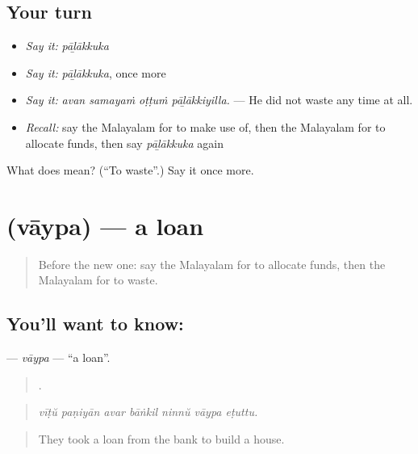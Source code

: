 \subsection*{Your turn}
\begin{itemize}
\raggedright
  \item \emph{Say it:} \emph{pāḻākkuka}
  \item \emph{Say it:} \emph{pāḻākkuka}, once more
  \item \emph{Say it:} \emph{avan samayaṁ oṭṭuṁ pāḻākkiyilla.} — He did not waste any time at all.
  \item \emph{Recall:} say the Malayalam for to make use of, then the Malayalam for to allocate funds, then say \emph{pāḻākkuka} again
\end{itemize}

\begin{tcolorbox}[breakable,colback=teal!4,colframe=teal!35!black,title={Before you move on}]
What does  mean? (\textquotedblleft{}To waste\textquotedblright{}.) Say it once more.
\end{tcolorbox}
\section[\texorpdfstring{\ml{വായ്പ} (vāypa)}{വായ്പ (vāypa)}]{ (vāypa) — a loan}

\label{lesson:ML-C458-vaypa}



\begin{quote}
Before the new one: say the Malayalam for to allocate funds, then the Malayalam for to waste.
\end{quote}

\subsection*{You'll want to know: }
\textbf{} — \emph{vāypa} — \textquotedblleft{}a loan\textquotedblright{}.

\begin{quote}
      .
\end{quote}

\begin{quote}
\emph{vīṭŭ paṇiyān avar bāṅkil ninnŭ vāypa eṭuttu.}
\end{quote}

\begin{quote}
They took a loan from the bank to build a house.
\end{quote}

